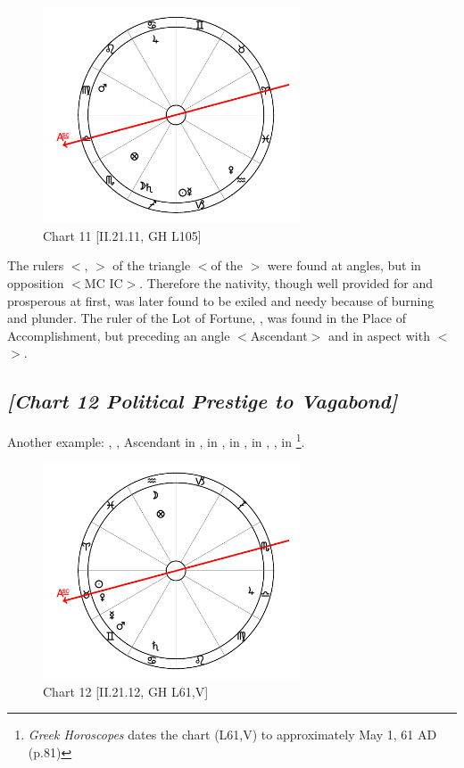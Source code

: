 \clearpage
\begin{figure}
\centering
\vspace{-20pt}
\includegraphics[width=0.68\textwidth]{charts/2_21_11}
\caption{Chart 11 [II.21.11, GH L105]}
\label{fig:chart11}
\end{figure}

The rulers $<$\Jupiter, \Sun$>$ of the triangle $<$of the \Sun$>$ were found at angles, but in opposition $<$MC IC$>$. Therefore the nativity, though well provided for and prosperous at first, was later found to be exiled and needy because of burning and plunder. The ruler of the Lot of Fortune, \Mars, was found in the Place of Accomplishment, but preceding an angle $<$Ascendant$>$ and in aspect with \Saturn $<$\Square$>$.

\newpage
\subsection*{\textit{[Chart 12 Political Prestige to Vagabond]}}

Another example: \Sun, \Venus, Ascendant in \Taurus, \Moon\xspace in \Aquarius, \Saturn\xspace in \Cancer, \Jupiter\xspace in \Libra, \Mars, \Mercury\xspace in \Gemini
\footnote{\textit{Greek Horoscopes} dates the chart (L61,V) to approximately May 1, 61 AD (p.81)}.

\clearpage
\begin{figure}
\centering
\vspace{-20pt}
\includegraphics[width=0.68\textwidth]{charts/2_21_12}
\caption{Chart 12 [II.21.12, GH L61,V]}
\label{fig:chart12}
\end{figure}

